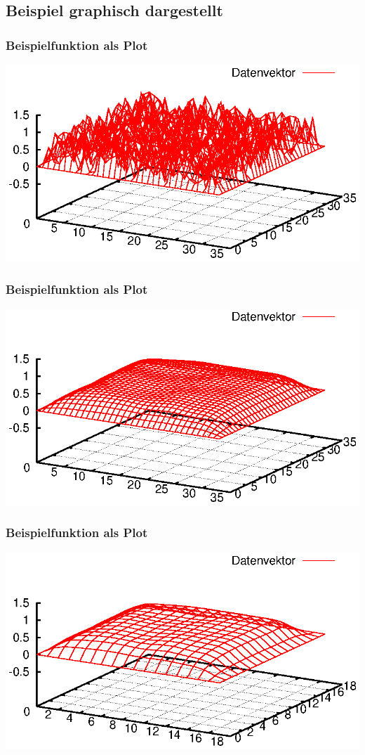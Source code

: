 \documentclass{beamer}
\begin{document}
\subsection{Beispiel graphisch dargestellt}
\begin{frame}\frametitle{Beispielfunktion als Plot}\includegraphics[width=\textwidth]{plots/000}\end{frame}
\begin{frame}\frametitle{Beispielfunktion als Plot}\includegraphics[width=\textwidth]{plots/001}\end{frame}
\begin{frame}\frametitle{Beispielfunktion als Plot}\includegraphics[width=\textwidth]{plots/002}\end{frame}
\end{document}
